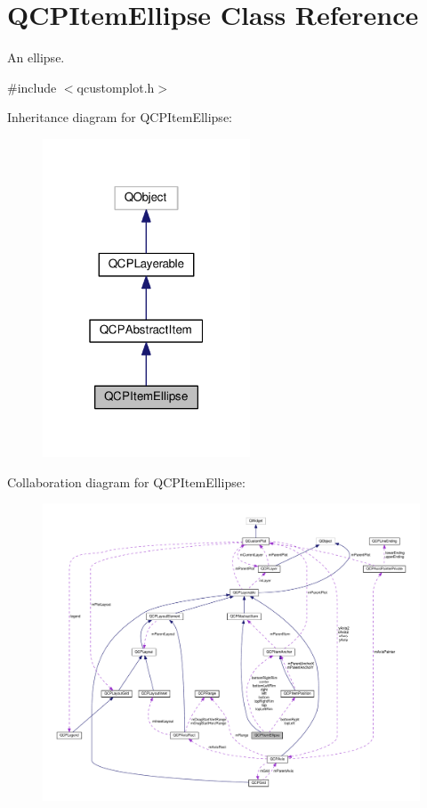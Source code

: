 \hypertarget{classQCPItemEllipse}{}\section{Q\+C\+P\+Item\+Ellipse Class Reference}
\label{classQCPItemEllipse}


An ellipse.  




{\ttfamily \#include $<$qcustomplot.\+h$>$}



Inheritance diagram for Q\+C\+P\+Item\+Ellipse\+:\nopagebreak
\begin{figure}[H]
\begin{center}
\leavevmode
\includegraphics[width=175pt]{classQCPItemEllipse__inherit__graph}
\end{center}
\end{figure}


Collaboration diagram for Q\+C\+P\+Item\+Ellipse\+:\nopagebreak
\begin{figure}[H]
\begin{center}
\leavevmode
\includegraphics[width=350pt]{classQCPItemEllipse__coll__graph}
\end{center}
\end{figure}
